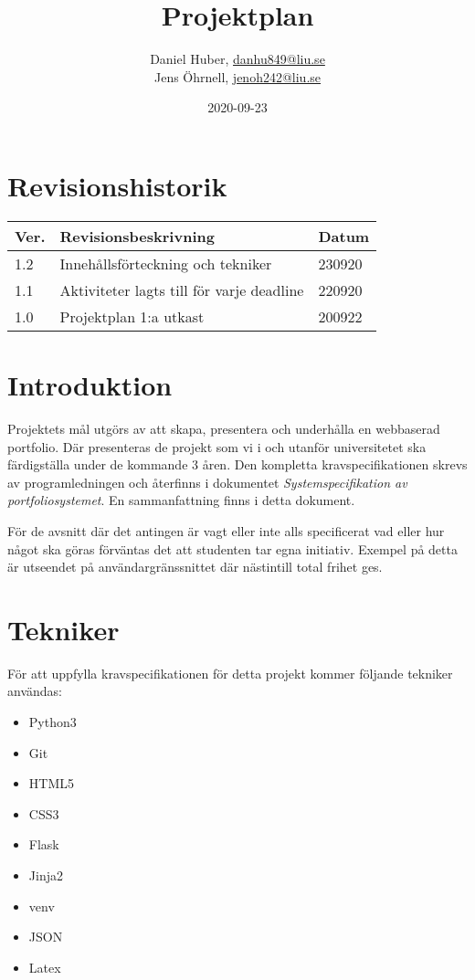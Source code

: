 \documentclass{TDP003mall}
\author{Daniel Huber, \url{danhu849@liu.se}\\
	Jens Öhrnell, \url{jenoh242@liu.se}}
\title{Projektplan}
\date{2020-09-23}
\begin{document}
\projectpage

\tableofcontents
\newpage



\section{Revisionshistorik}
\begin{table}[!h]
\begin{tabularx}{\linewidth}{|X|X|X|}
\hline
Ver. & Revisionsbeskrivning & Datum \\\hline
1.2 & Innehållsförteckning och tekniker & 230920\\\hline
1.1 & Aktiviteter lagts till för varje deadline & 220920\\\hline
1.0 & Projektplan 1:a utkast & 200922 \\\hline
\end{tabularx}
\end{table}


\section{Introduktion}
Projektets mål utgörs av att skapa, presentera och underhålla en webbaserad portfolio. Där presenteras de projekt som vi i och utanför universitetet ska färdigställa under de kommande 3 åren. Den kompletta kravspecifikationen skrevs av programledningen och återfinns i dokumentet \textit{Systemspecifikation av portfoliosystemet}. En sammanfattning finns i detta dokument.

För de avsnitt där det antingen är vagt eller inte alls specificerat vad eller hur något ska göras förväntas det att studenten tar egna initiativ. Exempel på detta är utseendet på användargränssnittet där nästintill total frihet ges.

\section{Tekniker}
För att uppfylla kravspecifikationen för detta projekt kommer följande tekniker användas:
\begin{itemize}
\item Python3
\item Git
\item HTML5
\item CSS3
\item Flask
\item Jinja2
\item venv
\item JSON
\item Latex
\end{itemize}
\end{document}
